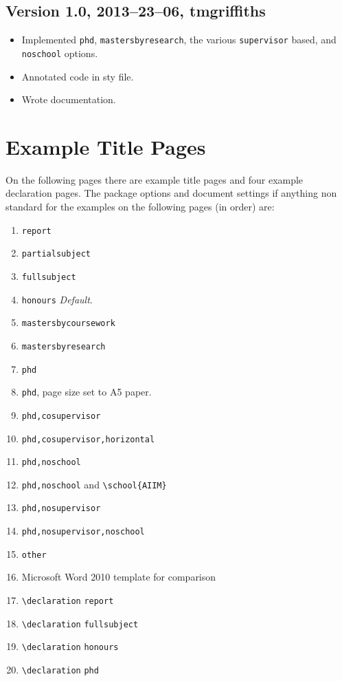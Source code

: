 \documentclass[12pt,oneside]{article}
\newcommand{\option}[1]{\texttt{\color{Green}#1}} %
\newcommand{\command}[1]{\texttt{\color{Red}#1}} %
\newcommand{\comoptions}[1]{\texttt{\color{Blue}#1}} %
\begin{document}
\subsection*{Version 1.0, 2013–23–06, tmgriffiths}
\begin{itemize}
    \item Implemented \option{phd}, \option{mastersbyresearch}, the various \option{supervisor} based, and \option{noschool} options.
    \item Annotated code in sty file.
    \item Wrote documentation.
\end{itemize}

\clearpage
\section{Example Title Pages}
On the following pages there are example title pages and four example declaration pages. The package options and document settings if anything non standard for the examples on the following pages (in order) are:
\begin{enumerate}
    \item \option{report}
    \item \option{partialsubject}
    \item \option{fullsubject}
    \item \option{honours} \emph{Default}.
    \item \option{mastersbycoursework}
    \item \option{mastersbyresearch}
    \item \option{phd}
    \item \option{phd}, page size set to A5 paper.
    \item \option{phd,cosupervisor}
    \item \option{phd,cosupervisor,horizontal}
    \item \option{phd,noschool}
    \item \option{phd,noschool} and \command{\textbackslash{}school}\comoptions{\{AIIM\}}
    \item \option{phd,nosupervisor}
    \item \option{phd,nosupervisor,noschool}
    \item \option{other}
    \item Microsoft Word 2010 template for comparison
    \item \command{\textbackslash{}declaration} \option{report}
    \item \command{\textbackslash{}declaration} \option{fullsubject}
    \item \command{\textbackslash{}declaration} \option{honours}
    \item \command{\textbackslash{}declaration} \option{phd}
\end{enumerate}
\end{document}

